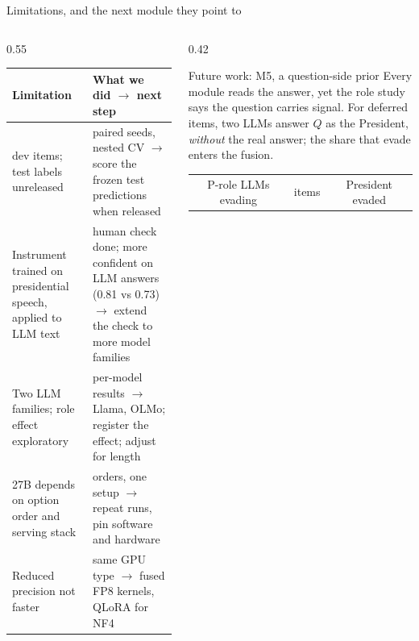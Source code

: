 \documentclass[aspectratio=169,10pt]{beamer}
\newcommand{\stagelabel}{Final evaluation}
\newcommand{\setstage}[1]{\renewcommand{\stagelabel}{#1}}
\begin{document}
\setstage{Conclusions}
\begin{frame}{Limitations, and the next module they point to}
  \begin{columns}[T]
    \begin{column}{0.55\textwidth}
      \footnotesize
      \renewcommand{\arraystretch}{1.25}\setlength{\tabcolsep}{3pt}
      \begin{tabular}{@{}>{\raggedright\arraybackslash}p{2.75cm}>{\raggedright\arraybackslash}p{4.2cm}@{}}
        \toprule
        \textbf{Limitation} & \textbf{What we did $\rightarrow$ next step} \\
        \midrule
        308 dev items; test labels unreleased & 10 paired seeds, nested CV $\rightarrow$ score the frozen test predictions when released \\
        Instrument trained on presidential speech, applied to LLM text & human check done; more confident on LLM answers (0.81 vs 0.73) $\rightarrow$ extend the check to more model families \\
        Two LLM families; role effect exploratory & per-model results $\rightarrow$ Llama, OLMo; register the effect; adjust for length \\
        27B depends on option order and serving stack & 4 orders, one setup $\rightarrow$ repeat runs, pin software and hardware \\
        Reduced precision not faster & same GPU type $\rightarrow$ fused FP8 kernels, QLoRA for NF4 \\
        \bottomrule
      \end{tabular}
    \end{column}
    \begin{column}{0.42\textwidth}
      \begin{block}{Future work: M5, a question-side prior}
        \footnotesize
        Every module reads the answer, yet the role study says the question carries signal. For deferred items, two LLMs answer
        $Q$ as the President, \emph{without} the real answer; the share that evade enters the fusion.
        \par\vspace{3pt}\centering
        \renewcommand{\arraystretch}{1.1}
        \begin{tabular}{@{}ccc@{}}
          \toprule
          P-role LLMs evading & items & President evaded \\

\end{tabular}
\end{block}
\end{column}
\end{columns}
\end{frame}
\end{document}
